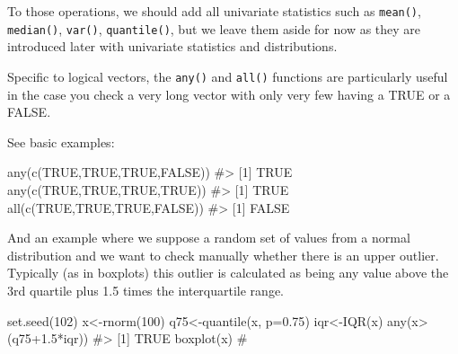 \documentclass[
  letterpaper,
  DIV=11,
  numbers=noendperiod]{scrreprt}
\newenvironment{Shaded}{\begin{snugshade}}{\end{snugshade}}
\newcommand{\AttributeTok}[1]{\textcolor[rgb]{0.40,0.45,0.13}{#1}}
\newcommand{\CommentTok}[1]{\textcolor[rgb]{0.37,0.37,0.37}{#1}}
\newcommand{\ConstantTok}[1]{\textcolor[rgb]{0.56,0.35,0.01}{#1}}
\newcommand{\DecValTok}[1]{\textcolor[rgb]{0.68,0.00,0.00}{#1}}
\newcommand{\FloatTok}[1]{\textcolor[rgb]{0.68,0.00,0.00}{#1}}
\newcommand{\FunctionTok}[1]{\textcolor[rgb]{0.28,0.35,0.67}{#1}}
\newcommand{\NormalTok}[1]{\textcolor[rgb]{0.00,0.23,0.31}{#1}}
\newcommand{\OtherTok}[1]{\textcolor[rgb]{0.00,0.23,0.31}{#1}}
\newcommand{\SpecialCharTok}[1]{\textcolor[rgb]{0.37,0.37,0.37}{#1}}
\begin{document}
To those operations, we should add all univariate statistics such as
\texttt{mean()}, \texttt{median()}, \texttt{var()}, \texttt{quantile()},
but we leave them aside for now as they are introduced later with
univariate statistics and distributions.

Specific to logical vectors, the \texttt{any()} and \texttt{all()}
functions are particularly useful in the case you check a very long
vector with only very few having a TRUE or a FALSE.

See basic examples:

\begin{Shaded}
\begin{Highlighting}[]
\FunctionTok{any}\NormalTok{(}\FunctionTok{c}\NormalTok{(}\ConstantTok{TRUE}\NormalTok{,}\ConstantTok{TRUE}\NormalTok{,}\ConstantTok{TRUE}\NormalTok{,}\ConstantTok{FALSE}\NormalTok{))}
\CommentTok{\#\textgreater{} [1] TRUE}
\FunctionTok{any}\NormalTok{(}\FunctionTok{c}\NormalTok{(}\ConstantTok{TRUE}\NormalTok{,}\ConstantTok{TRUE}\NormalTok{,}\ConstantTok{TRUE}\NormalTok{,}\ConstantTok{TRUE}\NormalTok{))}
\CommentTok{\#\textgreater{} [1] TRUE}
\FunctionTok{all}\NormalTok{(}\FunctionTok{c}\NormalTok{(}\ConstantTok{TRUE}\NormalTok{,}\ConstantTok{TRUE}\NormalTok{,}\ConstantTok{TRUE}\NormalTok{,}\ConstantTok{FALSE}\NormalTok{))}
\CommentTok{\#\textgreater{} [1] FALSE}
\end{Highlighting}
\end{Shaded}

And an example where we suppose a random set of values from a normal
distribution and we want to check manually whether there is an upper
outlier. Typically (as in boxplots) this outlier is calculated as being
any value above the 3rd quartile plus 1.5 times the interquartile range.

\begin{Shaded}
\begin{Highlighting}[]
\FunctionTok{set.seed}\NormalTok{(}\DecValTok{102}\NormalTok{)}
\NormalTok{x}\OtherTok{\textless{}{-}}\FunctionTok{rnorm}\NormalTok{(}\DecValTok{100}\NormalTok{)}
\NormalTok{q75}\OtherTok{\textless{}{-}}\FunctionTok{quantile}\NormalTok{(x, }\AttributeTok{p=}\FloatTok{0.75}\NormalTok{)}
\NormalTok{iqr}\OtherTok{\textless{}{-}}\FunctionTok{IQR}\NormalTok{(x)}
\FunctionTok{any}\NormalTok{(x}\SpecialCharTok{\textgreater{}}\NormalTok{(q75}\FloatTok{+1.5}\SpecialCharTok{*}\NormalTok{iqr))}
\CommentTok{\#\textgreater{} [1] TRUE}
\FunctionTok{boxplot}\NormalTok{(x) }\CommentTok{\#}
\end{Highlighting}
\end{Shaded}
\end{document}
